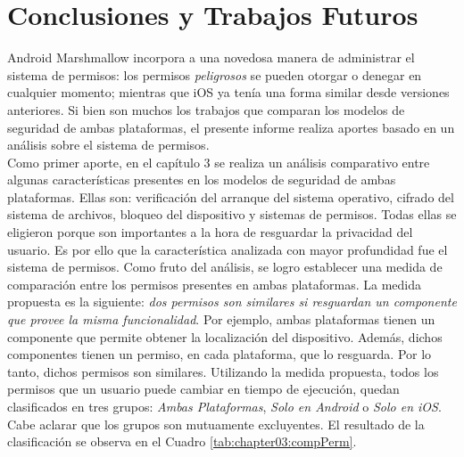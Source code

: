 \chapter{Conclusiones y Trabajos Futuros}
Android Marshmallow incorpora a una novedosa manera de administrar el sistema de permisos: los permisos \emph{peligrosos} se pueden otorgar o denegar en cualquier momento; mientras que iOS ya tenía una forma similar desde versiones anteriores. Si bien son muchos los trabajos que comparan los modelos de seguridad de ambas plataformas, el presente informe realiza aportes basado en un análisis sobre el sistema de permisos.\\

Como primer aporte, en el capítulo 3 se realiza un análisis comparativo entre algunas características presentes en los modelos de seguridad de ambas plataformas. Ellas son: verificación del arranque del sistema operativo, cifrado del sistema de archivos, bloqueo del dispositivo y sistemas de permisos. Todas ellas se eligieron porque son importantes a la hora de resguardar la privacidad del usuario. Es por ello que la característica analizada con mayor profundidad fue el sistema de permisos. Como fruto del análisis, se logro establecer una medida de comparación entre los permisos presentes en ambas plataformas. La medida propuesta es la siguiente: \emph{dos permisos son similares si resguardan un componente que provee la misma funcionalidad}. Por ejemplo, ambas plataformas tienen un componente que permite obtener la localización del dispositivo. Además, dichos componentes tienen un permiso, en cada plataforma, que lo resguarda. Por lo tanto, dichos permisos son similares. Utilizando la medida propuesta, todos los permisos que un usuario puede cambiar en tiempo de ejecución, quedan clasificados en tres grupos: \emph{Ambas Plataformas}, \emph{Solo en Android} o \emph{Solo en iOS}. Cabe aclarar que los grupos son mutuamente excluyentes. El resultado de la clasificación se observa en el Cuadro \ref{tab:chapter03:compPerm}.\\ 

